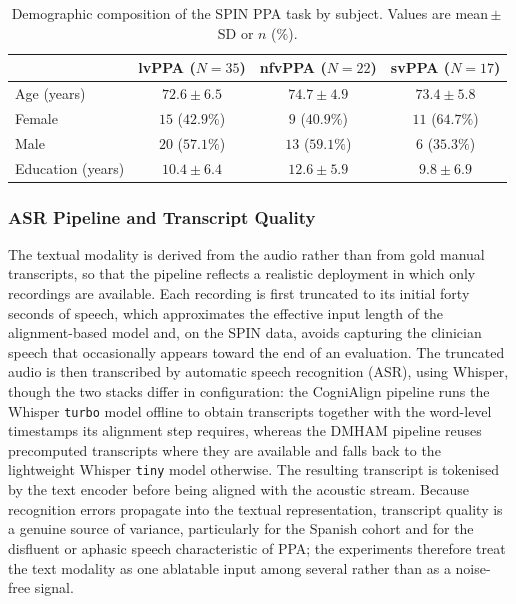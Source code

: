\documentclass[a4paper,12pt]{article}
\begin{document}
\begin{table}[H]
\centering
\caption[SPIN demographics by PPA variant]{\footnotesize Demographic composition of the SPIN PPA task by subject. Values are mean\,$\pm$\,SD or $n$ (\%).}
\label{tab:demo_ppa}
\footnotesize{
\begin{tabular}{@{}lccc@{}}
\toprule
 & \textbf{lvPPA} ($N=35$) & \textbf{nfvPPA} ($N=22$) & \textbf{svPPA} ($N=17$) \\ \midrule
Age (years)      & $72.6\pm6.5$ & $74.7\pm4.9$ & $73.4\pm5.8$ \\
Female           & $15$ ($42.9\%$) & $9$ ($40.9\%$) & $11$ ($64.7\%$) \\
Male             & $20$ ($57.1\%$) & $13$ ($59.1\%$) & $6$ ($35.3\%$) \\
Education (years)& $10.4\pm6.4$ & $12.6\pm5.9$ & $9.8\pm6.9$ \\
\bottomrule
\end{tabular}
}
\end{table}

\subsubsection{ASR Pipeline and Transcript Quality}

The textual modality is derived from the audio rather than from gold manual transcripts, so that the pipeline reflects a realistic deployment in which only recordings are available. Each recording is first truncated to its initial forty seconds of speech, which approximates the effective input length of the alignment-based model and, on the SPIN data, avoids capturing the clinician speech that occasionally appears toward the end of an evaluation. The truncated audio is then transcribed by automatic speech recognition (ASR), using Whisper, though the two stacks differ in configuration: the CogniAlign pipeline runs the Whisper \texttt{turbo} model offline to obtain transcripts together with the word-level timestamps its alignment step requires, whereas the DMHAM pipeline reuses precomputed transcripts where they are available and falls back to the lightweight Whisper \texttt{tiny} model otherwise. The resulting transcript is tokenised by the text encoder before being aligned with the acoustic stream. Because recognition errors propagate into the textual representation, transcript quality is a genuine source of variance, particularly for the Spanish cohort and for the disfluent or aphasic speech characteristic of PPA; the experiments therefore treat the text modality as one ablatable input among several rather than as a noise-free signal.
\end{document}
